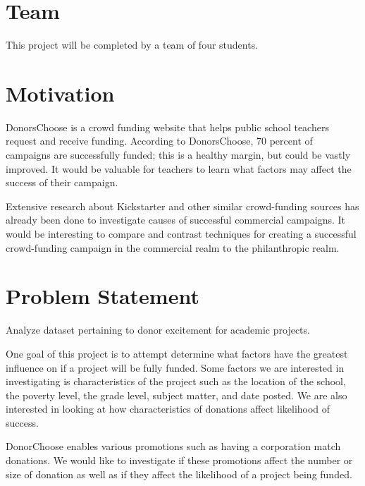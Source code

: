 \documentclass{article}
\begin{document}
 


\section{Team}
This project will be completed by a team of four students.

\section{Motivation}
DonorsChoose is a crowd funding website that helps public school teachers request and receive funding. According to DonorsChoose, 70 percent of campaigns are successfully funded; this is a healthy margin, but could be vastly improved. It would be valuable for teachers to learn what factors may affect the success of their campaign.  

Extensive research about Kickstarter and other similar crowd-funding sources has already been done to investigate causes of successful commercial campaigns. It would be interesting to compare and contrast techniques for creating a successful crowd-funding campaign in the commercial realm to the philanthropic realm.

\section{Problem Statement}
Analyze dataset pertaining to donor excitement for academic projects. 

One goal of this project is to attempt determine what factors have the greatest influence on if a project will be fully funded.  Some factors we are interested in investigating is characteristics of the project such as the location of the school, the poverty level, the grade level, subject matter, and date posted.  We are also interested in looking at how characteristics of donations affect likelihood of success.

DonorChoose enables various promotions such as having a corporation match donations.  We would like to investigate if these promotions affect the number or size of donation as well as if they affect the likelihood of a project being funded.
\end{document}
